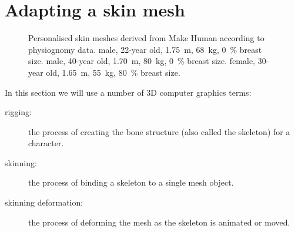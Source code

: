 \section{\label{sec:skin_mesh}Adapting a skin mesh}
\begin{figure}
\centering
{}
   \caption[Personalised skin meshes derived according to physiognomy data]{Personalised skin meshes derived from Make Human \cite{makehuman2010} according to physiognomy data.
    male, 22-year old, 1.75~m, 68~kg, 0~\% breast size.
    male, 40-year old, 1.70~m, 80~kg, 0~\% breast size.
    female, 30-year old, 1.65~m, 55~kg, 80~\% breast size.}
 
   \label{fig:diff_skin}
\end{figure}

In this section we will use a number of 3D computer graphics terms:
\begin{description}
	\item[rigging:] the process of creating the bone structure (also called the skeleton) for a character.
	\item[skinning:] the process of binding a skeleton to a single mesh object.
	\item[skinning deformation:] the process of deforming the mesh as the skeleton is animated or moved.
\end{description}	

